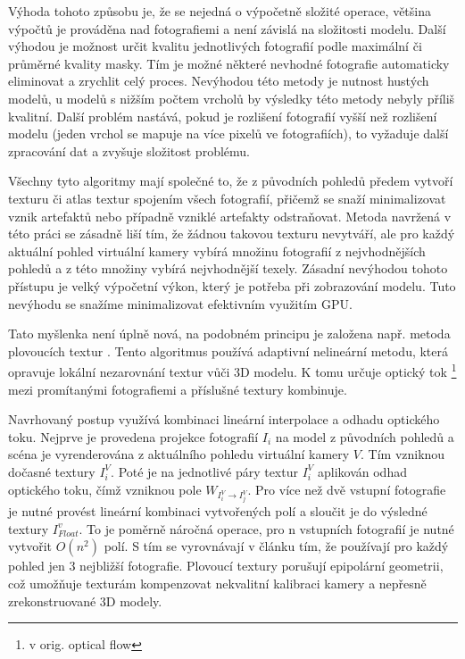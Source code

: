 \documentclass[11pt,twoside,a4paper]{book}
\begin{document}
Výhoda tohoto způsobu je, že se nejedná o výpočetně složité operace, většina
výpočtů je prováděna nad fotografiemi a není závislá na složitosti modelu. Další
výhodou je možnost určit kvalitu jednotlivých fotografií podle maximální či
průměrné kvality masky. Tím je možné některé nevhodné fotografie automaticky
eliminovat a zrychlit celý proces. Nevýhodou této metody je nutnost hustých
modelů, u modelů s nižším počtem vrcholů by výsledky této metody nebyly příliš
kvalitní. Další problém nastává, pokud je rozlišení fotografií vyšší než
rozlišení modelu (jeden vrchol se mapuje na více pixelů ve fotografiích), to
vyžaduje další zpracování dat a zvyšuje složitost problému.


Všechny tyto algoritmy mají společné to, že z původních pohledů předem vytvoří
texturu či atlas textur spojením všech fotografií, přičemž se snaží
minimalizovat vznik artefaktů nebo případně vzniklé artefakty odstraňovat.
Metoda navržená v této práci se zásadně liší tím, že žádnou takovou texturu
nevytváří, ale pro každý aktuální pohled virtuální kamery vybírá množinu
fotografií z nejvhodnějších pohledů a z této množiny vybírá nejvhodnější texely.
Zásadní nevýhodou tohoto přístupu je velký výpočetní výkon, který je potřeba při
zobrazování modelu. Tuto nevýhodu se snažíme minimalizovat efektivním využitím
GPU.

Tato myšlenka není úplně nová, na podobném principu je založena např. metoda
plovoucích textur \cite{floating-textures}. Tento algoritmus používá adaptivní
nelineární metodu, která opravuje lokální nezarovnání textur vůči 3D modelu. K
tomu určuje optický tok \footnote{v orig. optical flow} mezi promítanými fotografiemi a
příslušné textury kombinuje.

Navrhovaný postup využívá kombinaci lineární interpolace a odhadu optického
toku. Nejprve je provedena projekce fotografií $I_i$ na model z původních
pohledů a scéna je vyrenderována z aktuálního pohledu virtuální kamery $V$. Tím
vzniknou dočasné textury $I_i^V$. Poté je na jednotlivé páry textur $I_i^V$
aplikován odhad optického toku, čímž vzniknou pole $W_{I_i^V \rightarrow
I_j^V}$. Pro více než dvě vstupní fotografie je nutné provést lineární kombinaci
vytvořených polí a sloučit je do výsledné textury $I^v_{Float}$. To je poměrně náročná operace, pro n vstupních fotografií je nutné vytvořit $O(n^2)$ polí. S tím se vyrovnávají v článku tím, že používají pro každý pohled jen 3 nejbližší fotografie. Plovoucí textury porušují epipolární geometrii, což umožňuje texturám kompenzovat nekvalitní kalibraci kamery a nepřesně zrekonstruované 3D modely.
\end{document}
